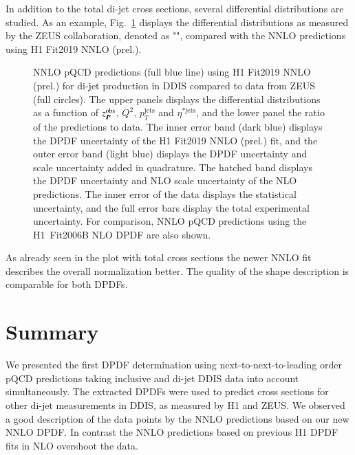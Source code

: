 \documentclass[12pt]{article}
\newcommand{\includegraphicss}[2][]{\fbox{\texttt{[image: \#2]}}}
\begin{document}
In addition to the total di-jet cross sections, several differential distributions are studied.
As an example, Fig.~\ref{figZEUSdiff} displays the differential distributions as measured by the ZEUS collaboration, denoted as "\ZLRG", compared with the NNLO predictions using H1 Fit2019 NNLO (prel.).
\begin{figure}[h]
\centering
\includegraphicss[trim={0cm 0.3cm 0 0.3cm},clip,width=.8\textwidth]{{{plots/H1prelim-19-013.fig7}}}
\caption{ NNLO pQCD predictions (full blue line) using H1 Fit2019 NNLO (prel.) for di-jet production in DDIS compared to data from ZEUS (full circles). The upper panels displays the differential distributions as a function of $z_{I\!\!P}^\mathrm{obs}$, $Q^2$, $p_T^\mathrm{jets}$ and $\eta^{*\mathrm{jets}}$, and the lower panel the ratio of the predictions to data. The inner error band (dark blue) displays the DPDF uncertainty of the H1 Fit2019 NNLO (prel.) fit, and the outer error band (light blue) displays the DPDF uncertainty and scale uncertainty added in quadrature. The hatched band displays the DPDF uncertainty and NLO scale uncertainty of the NLO predictions. The inner error of the data displays the statistical uncertainty, and the full error bars display the total experimental uncertainty. For comparison, NNLO pQCD predictions using the H1~Fit2006B NLO DPDF are also shown.}
\label{figZEUSdiff}
\end{figure}
As already seen in the plot with total cross sections the newer NNLO fit describes the overall normalization better. The quality of the shape description is comparable for both DPDFs.







\section{Summary}
\label{sect:Conclusion}

We presented the first DPDF determination using next-to-next-to-leading order pQCD predictions taking inclusive and di-jet DDIS data into account simultaneously.
The extracted DPDFs were used to predict cross sections for other di-jet measurements in DDIS, as measured by H1 and ZEUS.
We observed a good description of the data points by the NNLO predictions based on our new NNLO DPDF. In contrast the NNLO predictions based on previous H1 DPDF fits in NLO overshoot the data.
\end{document}
